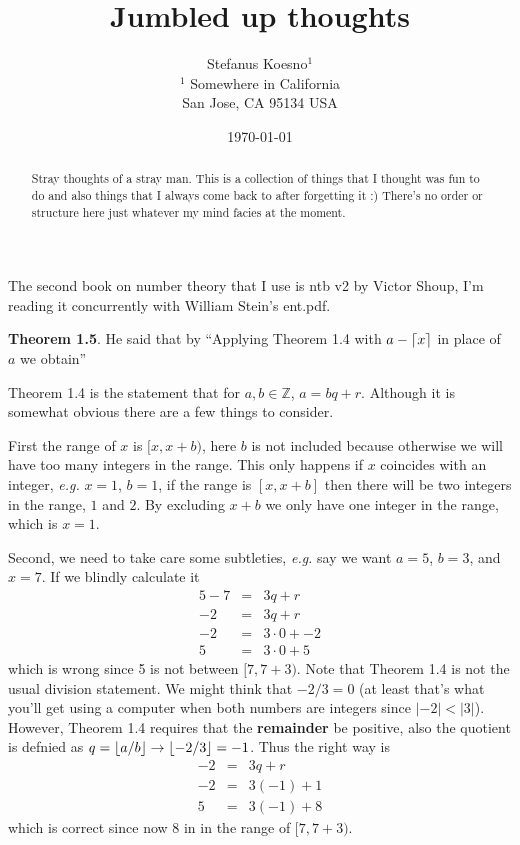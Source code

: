 \documentclass[aps,preprint,preprintnumbers,nofootinbib,showpacs,prd]{revtex4-1}
\newcommand{\eg}{{\it e.g.} }
\newcommand{\nbea}{\begin{eqnarray*}}
\newcommand{\neea}{\end{eqnarray*}}
\DeclarePairedDelimiter{\ceil}{\lceil}{\rceil}
\DeclarePairedDelimiter{\floor}{\lfloor}{\rfloor}
\begin{document}
\title{Jumbled up thoughts}
\bigskip
\author{Stefanus Koesno$^1$\\
$^1$ Somewhere in California\\ San Jose, CA 95134 USA\\
}
%
\date{\today}
%
\begin{abstract}
Stray thoughts of a stray man. This is a collection of things that I thought was fun to do and also things that I always come back to after forgetting it :) There's no order or structure here just whatever my mind facies at the moment.

\end{abstract}
%
\maketitle

\renewcommand{\theequation}{A.\arabic{equation}}  %
\setcounter{equation}{0}  %

The second book on number theory that I use is ntb v2 by Victor Shoup, I'm reading it concurrently with William Stein's ent.pdf.

{\bf Theorem 1.5}. He said that by ``Applying Theorem 1.4 with $a- \ceil{x}$ in place of $a$ we obtain''

Theorem 1.4 is the statement that for $a,b \in \mathbb{Z}$, $a = bq + r$. Although it is somewhat obvious there are a few things to consider.

First the range of $x$ is $[x,x+b)$, here $b$ is not included because otherwise we will have too many integers in the range. This only happens if $x$ coincides with an integer, \eg $x=1$, $b=1$, if the range is $[x,x+b]$ then there will be two integers in the range, $1$ and $2$. By excluding $x+b$ we only have one integer in the range, which is $x=1$.

Second, we need to take care some subtleties, \eg say we want $a=5$, $b=3$, and $x=7$. If we blindly calculate it
%
\nbea
5-7 & = & 3q + r \\
-2 & = & 3q + r \\
-2 & = & 3 \cdot 0 + -2 \\
5 & = & 3 \cdot 0 + 5
\neea
%
which is wrong since 5 is not between $[7,7+3)$. Note that Theorem 1.4 is not the usual division statement. We might think that $-2/3 = 0$ (at least that's what you'll get using a computer when both numbers are integers since $|-2| < |3|$). However, Theorem 1.4 requires that the {\bf remainder} be positive, also the quotient is defnied as $q = \floor{a/b} \to \floor{-2/3} = -1$. Thus the right way is
%
\nbea
-2 & = & 3q + r \\
-2 & = & 3 (-1) + 1 \\
5 & = & 3 (-1) + 8
\neea
%
which is correct since now $8$ in in the range of $[7,7+3)$.
\end{document}

